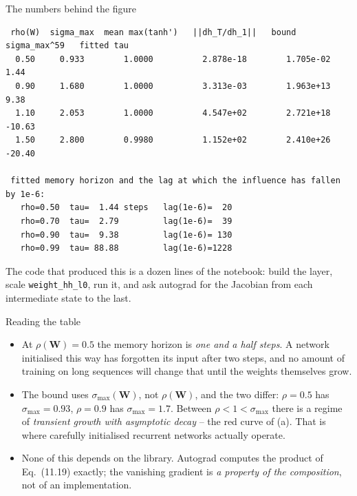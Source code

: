 \documentclass[10pt,aspectratio=169]{beamer}
\begin{document}
\begin{frame}[fragile]{The numbers behind the figure}
\begin{lstlisting}
 rho(W)  sigma_max  mean max(tanh')   ||dh_T/dh_1||   bound sigma_max^59   fitted tau
  0.50     0.933        1.0000          2.878e-18        1.705e-02           1.44
  0.90     1.680        1.0000          3.313e-03        1.963e+13           9.38
  1.10     2.053        1.0000          4.547e+02        2.721e+18         -10.63
  1.50     2.800        0.9980          1.152e+02        2.410e+26         -20.40

 fitted memory horizon and the lag at which the influence has fallen by 1e-6:
   rho=0.50  tau=  1.44 steps   lag(1e-6)=  20
   rho=0.70  tau=  2.79         lag(1e-6)=  39
   rho=0.90  tau=  9.38         lag(1e-6)= 130
   rho=0.99  tau= 88.88         lag(1e-6)=1228
\end{lstlisting}
\small
The code that produced this is a dozen lines of the notebook: build the
layer, scale \texttt{weight\_hh\_l0}, run it, and ask autograd for the
Jacobian from each intermediate state to the last.
\end{frame}

\begin{frame}{Reading the table}
\begin{itemize}
  \item At $\rho(\bm{W})=0.5$ the memory horizon is \emph{one and a half
        steps}.  A network initialised this way has forgotten its input
        after two steps, and no amount of training on long sequences will
        change that until the weights themselves grow.
  \item The bound uses $\sigma_{\max}(\bm{W})$, not $\rho(\bm{W})$, and the
        two differ: $\rho=0.5$ has $\sigma_{\max}=0.93$, $\rho=0.9$ has
        $\sigma_{\max}=1.7$.  Between $\rho<1<\sigma_{\max}$ there is a
        regime of \emph{transient growth with asymptotic decay} -- the
        red curve of (a).  That is where carefully initialised recurrent
        networks actually operate.
  \item None of this depends on the library.  Autograd computes the product
        of Eq.~(11.19) exactly; the vanishing gradient is \emph{a property
        of the composition}, not of an implementation.
\end{itemize}
\end{frame}
\end{document}
